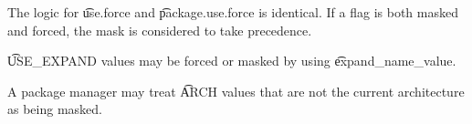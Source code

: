 The logic for \t{use.force} and \t{package.use.force} is identical. If a flag is both masked and
forced, the mask is considered to take precedence.

\t{USE\_EXPAND} values may be forced or masked by using \t{expand\_name\_value}.

A package manager may treat \t{ARCH} values that are not the current architecture as being masked.




